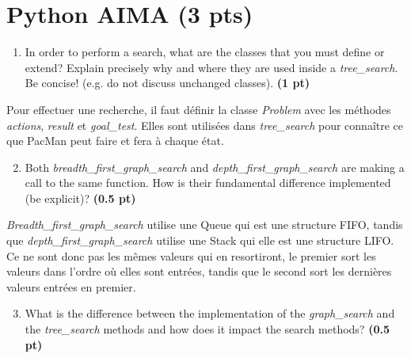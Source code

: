 \documentclass[11pt,a4paper]{../template/report}
\begin{document}
\maketitle

\section{Python AIMA (3 pts)}

\begin{enumerate}
  \item In order to perform a search, what are the classes that you must define or extend? Explain precisely why and where they are used inside a \textit{tree\_search}. Be concise! (e.g. do not discuss unchanged classes). \textbf{(1 pt)}
\end{enumerate}

\begin{answer}
Pour effectuer une recherche, il faut définir la classe \textit{Problem} avec les méthodes \textit{actions}, \textit{result} et \textit{goal\_test}. Elles sont utilisées dans \textit{tree\_search} pour connaître ce que PacMan peut faire et fera à chaque état.
\end{answer}



\begin{enumerate}
\setcounter{enumi}{1}
    \item Both \textit{breadth\_first\_graph\_search} and \textit{depth\_first\_graph\_search} are making a call to the same function. How is their fundamental difference implemented (be explicit)? \textbf{(0.5 pt)}
\end{enumerate}

\begin{answer}
\textit{Breadth\_first\_graph\_search} utilise une Queue qui est une structure FIFO, tandis que \textit{depth\_first\_graph\_search} utilise une Stack qui elle est une structure LIFO. Ce ne sont donc pas les mêmes valeurs qui en resortiront, le premier sort les valeurs dans l'ordre où elles sont entrées, tandis que le second sort les dernières valeurs entrées en premier.
\end{answer}



\begin{enumerate}
\setcounter{enumi}{2}
    \item What is the difference between the implementation of the \textit{graph\_search} and the \textit{tree\_search} methods and how does it impact the search methods? \textbf{(0.5 pt)}
\end{enumerate}
\end{document}
